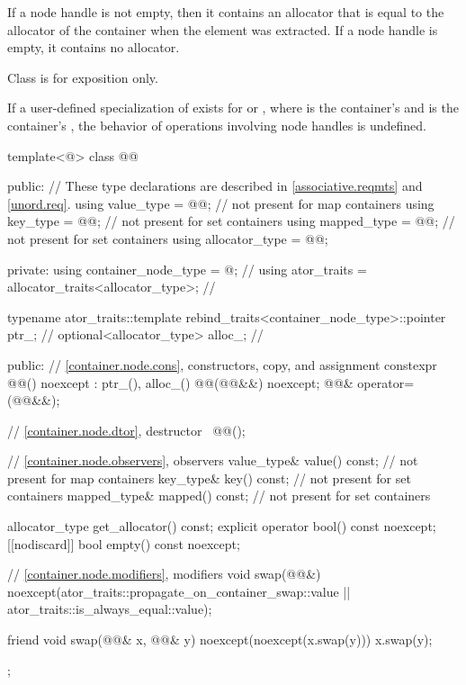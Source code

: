 \pnum
If a node handle is not empty, then it contains an allocator that is equal to
the allocator of the container when the element was extracted. If a node handle
is empty, it contains no allocator.

\pnum
Class  is for exposition only.

\pnum
If a user-defined specialization of  exists for
 or , where  is the
container's  and  is the container's
, the behavior of operations involving node handles is
undefined.

\begin{codeblock}
template<@\unspecnc@>
class @@ {
public:
  // These type declarations are described in \ref{associative.reqmts} and \ref{unord.req}.
  using value_type     = @\seebelownc{}@;     // not present for map containers
  using key_type       = @\seebelownc{}@;     // not present for set containers
  using mapped_type    = @\seebelownc{}@;     // not present for set containers
  using allocator_type = @\seebelownc{}@;

private:
  using container_node_type = @\unspecnc@;                  // \expos
  using ator_traits = allocator_traits<allocator_type>;     // \expos

  typename ator_traits::template
    rebind_traits<container_node_type>::pointer ptr_;       // \expos
  optional<allocator_type> alloc_;                          // \expos

public:
  // \ref{container.node.cons}, constructors, copy, and assignment
  constexpr @@() noexcept : ptr_(), alloc_() {}
  @@(@@&&) noexcept;
  @@& operator=(@@&&);

  // \ref{container.node.dtor}, destructor
  ~@@();

  // \ref{container.node.observers}, observers
  value_type& value() const;            // not present for map containers
  key_type& key() const;                // not present for set containers
  mapped_type& mapped() const;          // not present for set containers

  allocator_type get_allocator() const;
  explicit operator bool() const noexcept;
  [[nodiscard]] bool empty() const noexcept;

  // \ref{container.node.modifiers}, modifiers
  void swap(@@&)
    noexcept(ator_traits::propagate_on_container_swap::value ||
             ator_traits::is_always_equal::value);

  friend void swap(@@& x, @@& y) noexcept(noexcept(x.swap(y))) {
    x.swap(y);
  }
};
\end{codeblock}

